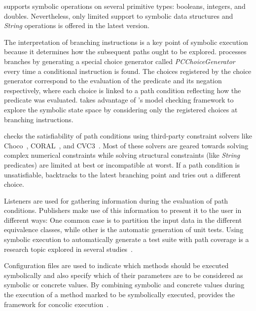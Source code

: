 \spf{} supports symbolic operations on several primitive types: booleans, integers, and doubles. Nevertheless, only limited support to symbolic data structures and \textit{String} operations is offered in the latest \spf{} version.

The interpretation of branching instructions is a key point of symbolic execution because it determines how the subsequent paths ought to be explored. \spf{} processes branches by generating a special choice generator called \textit{PCChoiceGenerator} every time a conditional instruction is found. The choices registered by the choice generator correspond to the evaluation of the predicate and its negation respectively, where each choice is linked to a path condition reflecting how the predicate was evaluated. \spf{} takes advantage of \jpf{}'s model checking framework to explore the symbolic state space by considering only the registered choices at branching instructions.

\spf{} checks the satisfiability of path conditions using third-party constraint solvers like Choco~\cite{Choco2016}, CORAL~\cite{Souza}, and CVC3~\cite{Barrett2007}. Most of these solvers are geared towards solving complex numerical constraints while solving structural constraints (like \textit{String} predicates) are limited at best or incompatible at worst. If a path condition is unsatisfiable, \spf{} backtracks to the latest branching point and tries out a different choice.

Listeners are used for gathering information during the evaluation of path conditions. Publishers make use of this information to present it to the user in different ways: One common case is to partition the input data in the different equivalence classes, while other is the automatic generation of unit tests. Using symbolic execution to automatically generate a test suite with path coverage is a research topic explored in several studies~\cite{Pasareanu2008b,Visser2004a,Godefroid2008}.

Configuration files are used to indicate which methods should be executed symbolically and also specify which of their parameters are to be considered as symbolic or concrete values. By combining symbolic and concrete values during the execution of a method marked to be symbolically executed, \spf{} provides the framework for concolic execution~\cite{Godefroid2005}.








